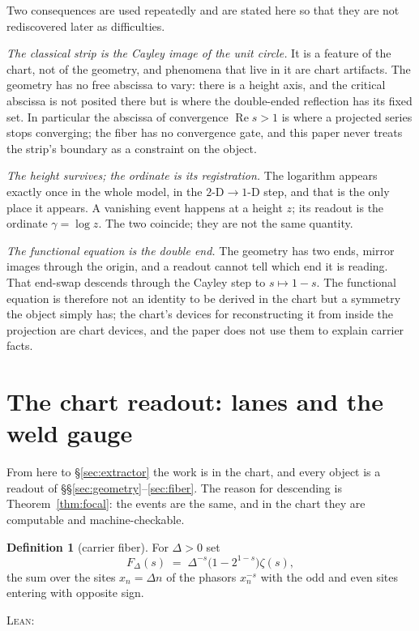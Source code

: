 \documentclass[11pt]{article}
\theoremstyle{plain}
\theoremstyle{definition}
\newtheorem{definition}[theorem]{Definition}
\theoremstyle{remark}
\newcommand{\leanref}[1]{%
  \par\nobreak\vspace{2pt}%
  {\footnotesize\raggedright\noindent\textsc{Lean:}~\texttt{\detokenize{#1}}\par}%
  \vspace{2pt}}
\begin{document}
\noindent
Two consequences are used repeatedly and are stated here so that they are not
rediscovered later as difficulties.

\emph{The classical strip is the Cayley image of the unit circle.} It is a feature of
the chart, not of the geometry, and phenomena that live in it are chart artifacts. The
geometry has no free abscissa to vary: there is a height axis, and the critical
abscissa is not posited there but is where the double-ended reflection has its fixed
set. In particular the abscissa of convergence $\operatorname{Re}s>1$ is where a
projected series stops converging; the fiber has no convergence gate, and this paper
never treats the strip's boundary as a constraint on the object.

\emph{The height survives; the ordinate is its registration.} The logarithm appears
exactly once in the whole model, in the $2\text{-D}\to1\text{-D}$ step, and that is the
only place it appears. A vanishing event happens at a height $z$; its readout is the
ordinate $\gamma=\log z$. The two coincide; they are not the same quantity.

\emph{The functional equation is the double end.} The geometry has two ends, mirror
images through the origin, and a readout cannot tell which end it is reading. That
end-swap descends through the Cayley step to $s\mapsto1-s$. The functional equation is
therefore not an identity to be derived in the chart but a symmetry the object simply
has; the chart's devices for reconstructing it from inside the projection are chart
devices, and the paper does not use them to explain carrier facts.

\section{The chart readout: lanes and the weld gauge}\label{sec:carrier}

From here to \S\ref{sec:extractor} the work is in the chart, and every object is a
readout of \S\S\ref{sec:geometry}--\ref{sec:fiber}. The reason for descending is
Theorem~\ref{thm:focal}: the events are the same, and in the chart they are
computable and machine-checkable.

\begin{definition}[carrier fiber]\label{def:fiber}
For $\Delta>0$ set
\[
  F_\Delta(s)\;=\;\Delta^{-s}\bigl(1-2^{1-s}\bigr)\zeta(s),
\]
the sum over the sites $x_n=\Delta n$ of the phasors $x_n^{-s}$ with the odd and even
sites entering with opposite sign.
\end{definition}
\leanref{carrierFiber}
\end{document}
